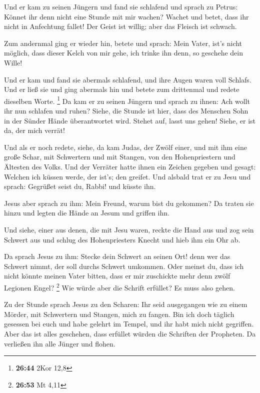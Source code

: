  Und er kam zu seinen Jüngern und fand sie schlafend und
sprach zu Petrus: Könnet ihr denn nicht eine Stunde mit mir wachen?
 Wachet und betet, dass ihr nicht in Anfechtung fallet!
Der Geist ist willig; aber das Fleisch ist schwach.

 Zum andernmal ging er wieder hin, betete und sprach:
Mein Vater, ist's nicht möglich, dass dieser Kelch von mir gehe, ich
trinke ihn denn, so geschehe dein Wille!

 Und er kam und fand sie abermals schlafend, und ihre
Augen waren voll Schlafs.  Und er ließ sie und ging
abermals hin und betete zum drittenmal und redete dieselben Worte.
\footnote{\textbf{26:44} 2Kor 12,8}  Da kam er zu seinen
Jüngern und sprach zu ihnen: Ach wollt ihr nun schlafen und ruhen?
Siehe, die Stunde ist hier, dass des Menschen Sohn in der Sünder Hände
überantwortet wird.  Stehet auf, lasst uns gehen! Siehe,
er ist da, der mich verrät!

 Und als er noch redete, siehe, da kam Judas, der Zwölf
einer, und mit ihm eine große Schar, mit Schwertern und mit Stangen, von
den Hohenpriestern und Ältesten des Volks.  Und der
Verräter hatte ihnen ein Zeichen gegeben und gesagt: Welchen ich küssen
werde, der ist's; den greifet.  Und alsbald trat er zu
Jesu und sprach: Gegrüßet seist du, Rabbi! und küsste ihn.

 Jesus aber sprach zu ihm: Mein Freund, warum bist du
gekommen? Da traten sie hinzu und legten die Hände an Jesum und griffen
ihn.

 Und siehe, einer aus denen, die mit Jesu waren, reckte
die Hand aus und zog sein Schwert aus und schlug des Hohenpriesters
Knecht und hieb ihm ein Ohr ab.

 Da sprach Jesus zu ihm: Stecke dein Schwert an seinen
Ort! denn wer das Schwert nimmt, der soll durchs Schwert umkommen.
 Oder meinst du, dass ich nicht könnte meinen Vater
bitten, dass er mir zuschickte mehr denn zwölf Legionen Engel?
\footnote{\textbf{26:53} Mt 4,11}  Wie würde aber die
Schrift erfüllet? Es muss also gehen.

 Zu der Stunde sprach Jesus zu den Scharen: Ihr seid
ausgegangen wie zu einem Mörder, mit Schwertern und Stangen, mich zu
fangen. Bin ich doch täglich gesessen bei euch und habe gelehrt im
Tempel, und ihr habt mich nicht gegriffen.  Aber das ist
alles geschehen, dass erfüllet würden die Schriften der Propheten. Da
verließen ihn alle Jünger und flohen.

